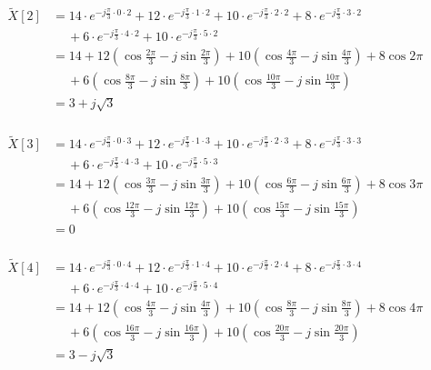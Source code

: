 \documentclass[a4paper,UTF8]{article}
\numberwithin{equation}{section}
\renewcommand{\tilde}{\widetilde}
\begin{document}
\begin{framed}
\begin{spacing}{1.5}
\begin{itemize}
        $
        \begin{aligned}
        \tilde{X}[2] & = 14 \cdot e^{-j \frac{\pi}{3} \cdot 0 \cdot 2} + 12 \cdot e^{-j \frac{\pi}{3} \cdot 1 \cdot 2} + 10 \cdot e^{-j \frac{\pi}{3} \cdot 2 \cdot 2} + 8 \cdot e^{-j \frac{\pi}{3} \cdot 3 \cdot 2} \\
        &\quad\ + 6 \cdot e^{-j \frac{\pi}{3} \cdot 4 \cdot 2} + 10 \cdot e^{-j \frac{\pi}{3} \cdot 5 \cdot 2}  \\
        & = 14 + 12(\cos\frac{2\pi}{3} - j\sin\frac{2\pi}{3}) + 10(\cos\frac{4\pi}{3} - j\sin\frac{4\pi}{3}) + 8\cos 2\pi  \\
        &\quad\ + 6(\cos\frac{8\pi}{3} - j\sin\frac{8\pi}{3}) + 10(\cos\frac{10\pi}{3} - j\sin\frac{10\pi}{3})  \\
        & = 3 + j\sqrt{3}  \\
        \end{aligned}
        $
        
        $
        \begin{aligned}
        \tilde{X}[3] & = 14 \cdot e^{-j \frac{\pi}{3} \cdot 0 \cdot 3} + 12 \cdot e^{-j \frac{\pi}{3} \cdot 1 \cdot 3} + 10 \cdot e^{-j \frac{\pi}{3} \cdot 2 \cdot 3} + 8 \cdot e^{-j \frac{\pi}{3} \cdot 3 \cdot 3} \\
        &\quad\ + 6 \cdot e^{-j \frac{\pi}{3} \cdot 4 \cdot 3} + 10 \cdot e^{-j \frac{\pi}{3} \cdot 5 \cdot 3}  \\
        & = 14 + 12(\cos\frac{3\pi}{3} - j\sin\frac{3\pi}{3}) + 10(\cos\frac{6\pi}{3} - j\sin\frac{6\pi}{3}) + 8\cos 3\pi  \\
        &\quad\ + 6(\cos\frac{12\pi}{3} - j\sin\frac{12\pi}{3}) + 10(\cos\frac{15\pi}{3} - j\sin\frac{15\pi}{3})  \\
        & = 0  \\
        \end{aligned}
        $

        \newpage
        
        $
        \begin{aligned}
        \tilde{X}[4] & = 14 \cdot e^{-j \frac{\pi}{3} \cdot 0 \cdot 4} + 12 \cdot e^{-j \frac{\pi}{3} \cdot 1 \cdot 4} + 10 \cdot e^{-j \frac{\pi}{3} \cdot 2 \cdot 4} + 8 \cdot e^{-j \frac{\pi}{3} \cdot 3 \cdot 4} \\
        &\quad\ + 6 \cdot e^{-j \frac{\pi}{3} \cdot 4 \cdot 4} + 10 \cdot e^{-j \frac{\pi}{3} \cdot 5 \cdot 4}  \\
        & = 14 + 12(\cos\frac{4\pi}{3} - j\sin\frac{4\pi}{3}) + 10(\cos\frac{8\pi}{3} - j\sin\frac{8\pi}{3}) + 8\cos 4\pi  \\
        &\quad\ + 6(\cos\frac{16\pi}{3} - j\sin\frac{16\pi}{3}) + 10(\cos\frac{20\pi}{3} - j\sin\frac{20\pi}{3})  \\
        & = 3 - j\sqrt{3}  \\
        \end{aligned}
        $
        

\end{itemize}
\end{spacing}
\end{framed}
\end{document}
